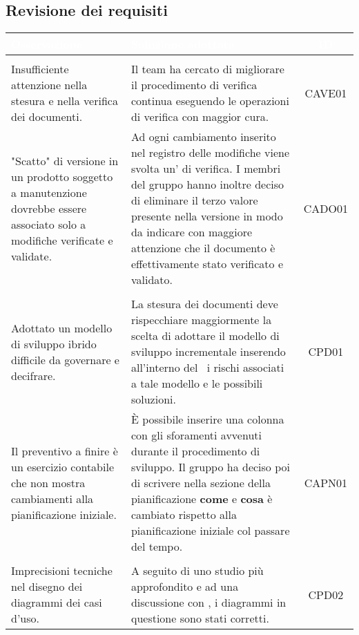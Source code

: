 \subsection{Revisione dei requisiti}
	\begin{longtable}{|C{4cm}|C{9cm}|c|}
		\textcolor{white}{\textbf{Osservazione}}&
		\textcolor{white}{\textbf{Soluzione adottata}}&
		\textcolor{white}{\textbf{ID}}\label{tab:CriticitàRR}\\ \hline
		\\ \hline
		Insufficiente attenzione nella stesura e nella verifica dei documenti. & Il team ha cercato di migliorare il procedimento di verifica continua eseguendo le operazioni di verifica con maggior cura. & CAVE01\\ \hline %
		"Scatto" di versione in un prodotto soggetto a manutenzione dovrebbe essere associato solo a modifiche verificate e validate. & Ad ogni cambiamento inserito nel registro delle modifiche viene svolta un' di verifica. I membri del gruppo hanno inoltre deciso di eliminare il terzo valore presente nella versione in modo da indicare con maggiore attenzione che il documento è effettivamente stato verificato e validato. & CADO01\\ \hline %
		\\ \hline
		Adottato un modello di sviluppo ibrido difficile da governare e decifrare. & La stesura dei documenti deve rispecchiare maggiormente la scelta di adottare il modello di sviluppo incrementale inserendo all'interno del \PdP\ i rischi associati a tale modello e le possibili soluzioni. & CPD01\\ \hline %
		Il preventivo a finire è un esercizio contabile che non mostra cambiamenti alla pianificazione iniziale. & È possibile inserire una colonna con gli sforamenti avvenuti durante il procedimento di sviluppo. Il gruppo ha deciso poi di scrivere nella sezione della pianificazione \textbf{come} e \textbf{cosa} è cambiato rispetto alla pianificazione iniziale col passare del tempo. & CAPN01\\ \hline \newpage %
		\\ \hline
		Imprecisioni tecniche nel disegno dei diagrammi dei casi d'uso. & A seguito di uno studio più approfondito e ad una discussione con \CR{}, i diagrammi in questione sono stati corretti. & CPD02\\ \hline %

\end{longtable}
